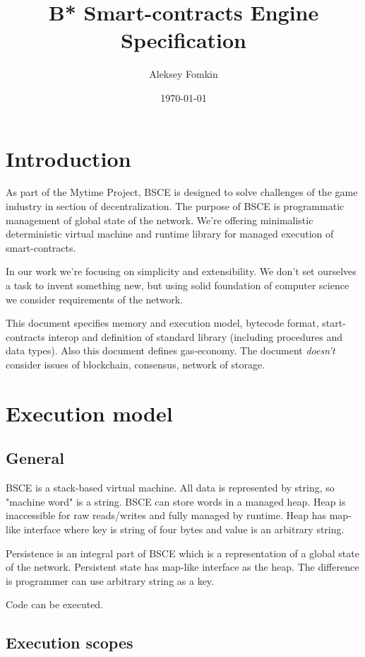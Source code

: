 \documentclass[12pt,a4paper]{article}
\title{B* Smart-contracts Engine Specification}
\author{Aleksey Fomkin}
\date{\today}
\begin{document}
\maketitle

\section{Introduction}

As part of the Mytime Project, BSCE is designed to solve challenges of the game industry in section of decentralization. The purpose of BSCE is programmatic management of global state of the network. We're offering minimalistic deterministic virtual machine and runtime library for managed execution of smart-contracts.

In our work we're focusing on simplicity and extensibility. We don't set ourselves a task to invent something new, but using solid foundation of computer science we consider requirements of the network.

This document specifies memory and execution model, bytecode format, start-contracts interop and definition of standard library (including procedures and data types). Also this document defines gas-economy. The document \textit{doesn't} consider issues of blockchain, consensus, network of storage. 

\section{Execution model}

\subsection{General}

BSCE is a stack-based virtual machine. All data is represented by string, so "machine word" is a string. BSCE can store words in a managed heap. Heap is inaccessible for raw reads/writes and fully managed by runtime. Heap has map-like interface where key is string of four bytes and value is an arbitrary string. 

Persistence is an integral part of BSCE which is a representation of a global state of the network. Persistent state has map-like interface as the heap. The difference is programmer can use arbitrary string as a key.

Code can be executed.
\subsection{Execution scopes}
\end{document}

